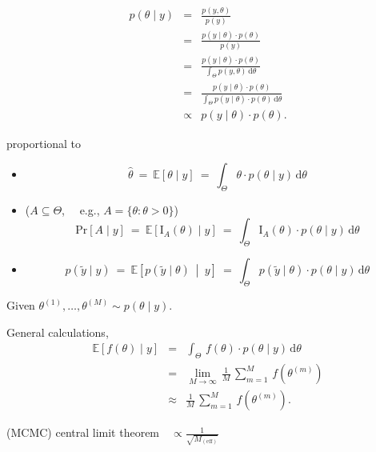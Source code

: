 \documentclass[9pt]{report}
\begin{document}
{\footnotesize
\begin{eqnarray*}
p(\theta \mid y) & = & \frac{p(y, \theta)}{p(y)}
\\[4pt]
& = & \frac{p(y \mid \theta) \cdot p(\theta)}{p(y)}
\\[4pt]
& = & \frac{p(y \mid \theta) \cdot p(\theta)}{\int_{\Theta} p(y, \theta) \, \textrm{d}\theta}
\\[4pt]
& = & \frac{p(y \mid \theta) \cdot p(\theta)}{\int_{\Theta} p(y \mid \theta) \cdot p(\theta) \, \textrm{d}\theta}
\\[10pt]
& \propto &
p(y \mid \theta) \cdot p(\theta).
\end{eqnarray*}
\begin{subitemize}
\item {} proportional to 
\end{subitemize}
}

\begin{itemize}
\item {}
$$
\hat{\theta}
\ = \ \mathbb{E}\!\left[\theta \mid y\right]
\ = \
\int_{\Theta} \theta \cdot p(\theta \mid y) \, \textrm{d}\theta
$$
\item {} ($A \subseteq \Theta$, \ \ {\footnotesize e.g., $A = \{ \theta : \theta > 0\}$})
$$
\textrm{Pr}[A \mid y]
\ = \ \mathbb{E}\!\left[\textrm{I}_A(\theta) \mid y\right]
\ = \
\int_{\Theta} \textrm{I}_A(\theta) \cdot p(\theta \mid y)
\, \textrm{d}\theta
$$
\item {}
$$
p(\tilde{y} \mid y)
\ = \ \mathbb{E}\!\left[p(\tilde{y} \mid \theta) \ \middle| \ y\right]
\ = \
\int_{\Theta} p(\tilde{y} \mid \theta) \cdot p(\theta \mid y)
\, \textrm{d} \theta
$$
\end{itemize}

\begin{subitemize}
\item Given  $\theta^{(1)}, \ldots, \theta^{(M)} \sim p(\theta \mid y).$
\item General  calculations,
\begin{eqnarray*}
\mathbb{E}[f(\theta) \mid y]
& = &
\int_{\Theta} \, f(\theta) \cdot p(\theta \mid y) \, \textrm{d}\theta
\\[8pt]
& = &
\lim_{M \rightarrow \infty} \,
\frac{1}{M} \, \sum_{m=1}^M \, f\!\left(\theta^{(m)}\right)
\\[8pt]
& \approx &
\frac{1}{M} \, \sum_{m=1}^M \, f\!\left(\theta^{(m)}\right).
\end{eqnarray*}
\item (MCMC) central limit theorem  $\mbox{ } \propto \frac{\displaystyle 1}{\displaystyle \sqrt{M_{(\textrm{eff})}}}$
\end{subitemize}
\end{document}
